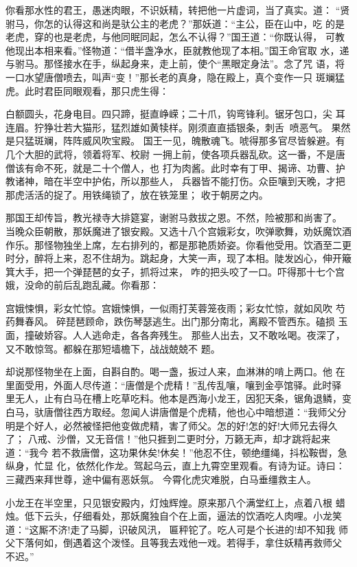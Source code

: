 你看那水性的君王，愚迷肉眼，不识妖精，转把他一片虚词，当了真实。道：
“贤驸马，你怎的认得这和尚是驮公主的老虎？”那妖道：“主公，臣在山中，吃
的是老虎，穿的也是老虎，与他同眠同起，怎么不认得？”国王道：“你既认得，
可教他现出本相来看。”怪物道：“借半盏净水，臣就教他现了本相。”国王命官取
水，递与驸马。那怪接水在手，纵起身来，走上前，使个“黑眼定身法”。念了咒
语，将一口水望唐僧喷去，叫声“变！”那长老的真身，隐在殿上，真个变作一只
斑斓猛虎。此时君臣同眼观看，那只虎生得：

白额圆头，花身电目。四只蹄，挺直峥嵘；二十爪，钩弯锋利。锯牙包口，尖
耳连眉。狞狰壮若大猫形，猛烈雄如黄犊样。刚须直直插银条，刺舌喷恶气。
果然是只猛斑斓，阵阵威风吹宝殿。
国王一见，魄散魂飞。唬得那多官尽皆躲避。有几个大胆的武将，领着将军、校尉
一拥上前，使各项兵器乱砍。这一番，不是唐僧该有命不死，就是二十个僧人，也
打为肉酱。此时幸有丁甲、揭谛、功曹、护教诸神，暗在半空中护佑，所以那些人，
兵器皆不能打伤。众臣嚷到天晚，才把那虎活活的捉了。用铁绳锁了，放在铁笼里；
收于朝房之内。

那国王却传旨，教光禄寺大排筵宴，谢驸马救拔之恩。不然，险被那和尚害了。
当晚众臣朝散，那妖魔进了银安殿。又选十八个宫娥彩女，吹弹歌舞，劝妖魔饮酒
作乐。那怪物独坐上席，左右排列的，都是那艳质娇姿。你看他受用。饮酒至二更
时分，醉将上来，忍不住胡为。跳起身，大笑一声，现了本相。陡发凶心，伸开簸
箕大手，把一个弹琵琶的女子，抓将过来，咋的把头咬了一口。吓得那十七个宫
娥，没命的前后乱跑乱藏。你看那：

宫娥悚惧，彩女忙惊。宫娥悚惧，一似雨打芙蓉笼夜雨；彩女忙惊，就如风吹
芍药舞春风。碎琵琶顾命，跌伤琴瑟逃生。出门那分南北，离殿不管西东。磕损
玉面，撞破娇容。人人逃命走，各各奔残生。
那些人出去，又不敢吆喝。夜深了，又不敢惊驾。都躲在那短墙檐下，战战兢兢不
题。

却说那怪物坐在上面，自斟自酌。喝一盏，扳过人来，血淋淋的啃上两口。他
在里面受用，外面人尽传道：“唐僧是个虎精！”乱传乱嚷，嚷到金亭馆驿。此时驿
里无人，止有白马在槽上吃草吃料。他本是西海小龙王，因犯天条，锯角退鳞，变
白马，驮唐僧往西方取经。忽闻人讲唐僧是个虎精，他也心中暗想道：“我师父分
明是个好人，必然被怪把他变做虎精，害了师父。怎的好!怎的好!大师兄去得久了；
八戒、沙僧，又无音信！”他只捱到二更时分，万籁无声，却才跳将起来道：“我今
若不救唐僧，这功果休矣!休矣！”他忍不住，顿绝缰绳，抖松鞍辔，急纵身，忙显
化，依然化作龙。驾起乌云，直上九霄空里观看。有诗为证。诗曰：
三藏西来拜世尊，途中偏有恶妖氛。
今霄化虎灾难脱，白马垂缰救主人。

小龙王在半空里，只见银安殿内，灯烛辉煌。原来那八个满堂红上，点着八根
蜡烛。低下云头，仔细看处，那妖魔独自个在上面，逼法的饮酒吃人肉哩。小龙笑
道：“这厮不济!走了马脚，识破风汛，匾秤铊了。吃人可是个长进的!却不知我
师父下落何如，倒遇着这个泼怪。且等我去戏他一戏。若得手，拿住妖精再救师父
不迟。”


